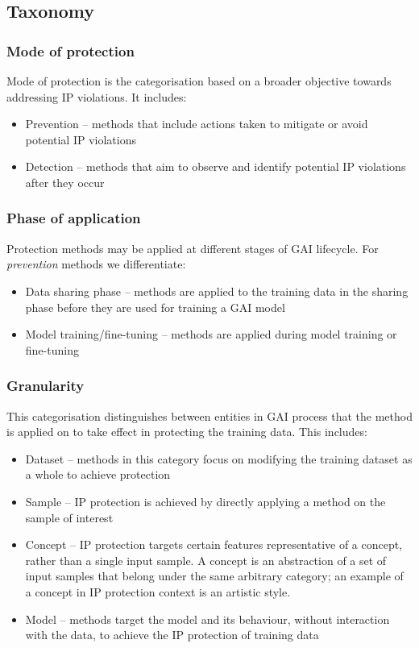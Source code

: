 \documentclass[conference]{IEEEtran}
\begin{document}

\subsection{Taxonomy}\label{sec:mitigation-taxonomy}
 
\subsubsection{Mode of protection}
Mode of protection is the categorisation based on a broader objective towards addressing IP violations. 
It includes:
\begin{itemize}
    \item Prevention -- methods that include actions taken to mitigate or avoid potential IP violations  
    \item Detection -- methods that aim to observe and identify potential IP violations after they occur
\end{itemize}
\subsubsection{Phase of application}
Protection methods may be applied at different stages of GAI lifecycle. 
For \textit{prevention} methods we differentiate:
\begin{itemize}
    \item Data sharing phase -- methods are applied to the training data in the sharing phase before they are used for training a GAI model
    \item Model training/fine-tuning -- methods are applied during model training or fine-tuning
\end{itemize}
\subsubsection{Granularity}
This categorisation distinguishes between entities in GAI process that the method is applied on to take effect in protecting the training data. 
This includes:
\begin{itemize}
    \item Dataset -- methods in this category focus on modifying the training dataset as a whole to achieve protection
    \item Sample -- IP protection is achieved by directly applying a method on the sample of interest
    \item Concept -- IP protection targets certain features representative of a concept, rather than a single input sample. A concept is an abstraction of a set of input samples that belong under the same arbitrary category; an example of a concept in IP protection context is an artistic style.
    \item Model -- methods target the model and its behaviour, without interaction with the data, to achieve the IP protection of training data
\end{itemize}
\end{document}
